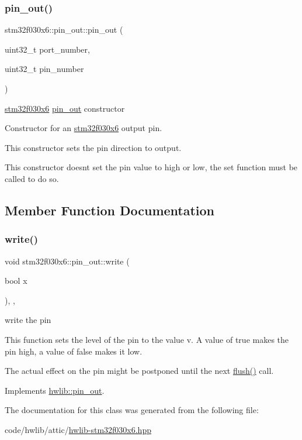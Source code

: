 \subsubsection{\texorpdfstring{pin\+\_\+out()}{pin\_out()}}
{\footnotesize\ttfamily stm32f030x6\+::pin\+\_\+out\+::pin\+\_\+out (\begin{DoxyParamCaption}\item[{uint32\+\_\+t}]{port\+\_\+number,  }\item[{uint32\+\_\+t}]{pin\+\_\+number }\end{DoxyParamCaption})\hspace{0.3cm}{\ttfamily [inline]}}

\hyperlink{namespacestm32f030x6}{stm32f030x6} \hyperlink{classstm32f030x6_1_1pin__out}{pin\+\_\+out} constructor

Constructor for an \hyperlink{namespacestm32f030x6}{stm32f030x6} output pin.

This constructor sets the pin direction to output.

This constructor doesn\textquotesingle{}t set the pin value to high or low, the set function must be called to do so. 

\subsection{Member Function Documentation}
\mbox{\label{classstm32f030x6_1_1pin__out_a6f859b59bf358e37fffe4d20fc5a718a}} 
\subsubsection{\texorpdfstring{write()}{write()}}
{\footnotesize\ttfamily void stm32f030x6\+::pin\+\_\+out\+::write (\begin{DoxyParamCaption}\item[{bool}]{x }\end{DoxyParamCaption})\hspace{0.3cm}{\ttfamily [inline]}, {\ttfamily [override]}, {\ttfamily [virtual]}}





write the pin

This function sets the level of the pin to the value v. A value of true makes the pin high, a value of false makes it low.

The actual effect on the pin might be postponed until the next \hyperlink{classhwlib_1_1pin__out_ac22910317477a52431a44e7e3c66fc57}{flush()} call. 

Implements \hyperlink{classhwlib_1_1pin__out_a8d260a70e503dcfb81987c408e170300}{hwlib\+::pin\+\_\+out}.



The documentation for this class was generated from the following file\+:\begin{DoxyCompactItemize}
\item 
code/hwlib/attic/\hyperlink{hwlib-stm32f030x6_8hpp}{hwlib-\/stm32f030x6.\+hpp}\end{DoxyCompactItemize}
